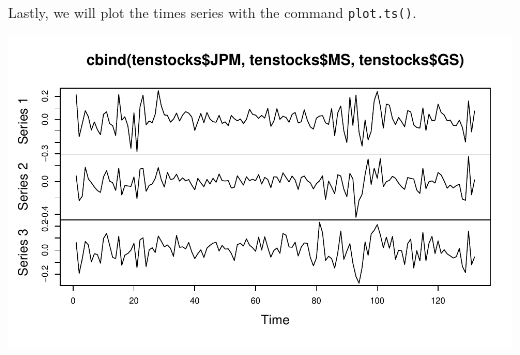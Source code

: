 \documentclass[12pt,a4paper]{article}
\newenvironment{Shaded}{\begin{snugshade}}{\end{snugshade}}
\newcommand{\KeywordTok}[1]{\textcolor[rgb]{0.13,0.29,0.53}{\textbf{#1}}}
\newcommand{\NormalTok}[1]{#1}
\newcommand{\OperatorTok}[1]{\textcolor[rgb]{0.81,0.36,0.00}{\textbf{#1}}}
\begin{document}
Lastly, we will plot the times series with the command
\texttt{plot.ts()}.

\begin{Shaded}
\end{Shaded}

\includegraphics{exercise_1_files/figure-latex/unnamed-chunk-9-1.pdf}
\end{document}

